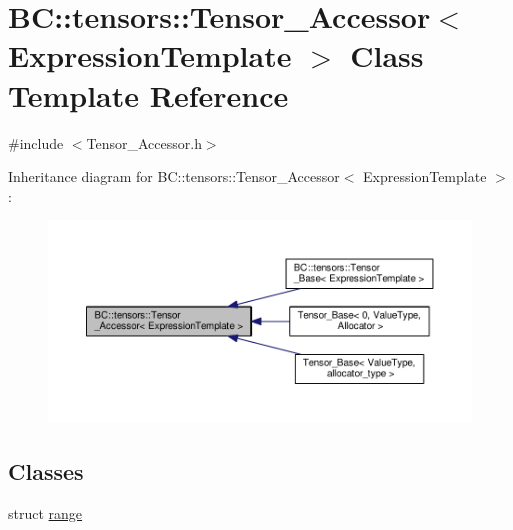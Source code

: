 \hypertarget{classBC_1_1tensors_1_1Tensor__Accessor}{}\section{BC\+:\+:tensors\+:\+:Tensor\+\_\+\+Accessor$<$ Expression\+Template $>$ Class Template Reference}
\label{classBC_1_1tensors_1_1Tensor__Accessor}


{\ttfamily \#include $<$Tensor\+\_\+\+Accessor.\+h$>$}



Inheritance diagram for BC\+:\+:tensors\+:\+:Tensor\+\_\+\+Accessor$<$ Expression\+Template $>$\+:
\nopagebreak
\begin{figure}[H]
\begin{center}
\leavevmode
\includegraphics[width=350pt]{classBC_1_1tensors_1_1Tensor__Accessor__inherit__graph}
\end{center}
\end{figure}
\subsection*{Classes}
\begin{DoxyCompactItemize}
\item 
struct \hyperlink{structBC_1_1tensors_1_1Tensor__Accessor_1_1range}{range}
\end{DoxyCompactItemize}
